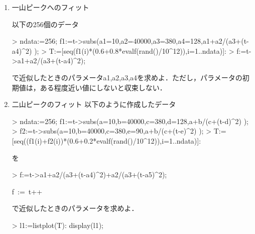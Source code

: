 \begin{enumerate}
\item 一山ピークへのフィット

以下の256個のデータ
\begin{MapleInput}
> ndata:=256; f1:=t->subs({a1=10,a2=40000,a3=380,a4=128},a1+a2/(a3+(t-a4)^2) );
> T:=[seq(f1(i)*(0.6+0.8*evalf(rand()/10^12)),i=1..ndata)]:
> f:=t->a1+a2/(a3+(t-a4)^2);
\end{MapleInput}
で近似したときのパラメータa1,a2,a3,a4を求めよ．ただし，パラメータの初期値は，ある程度近い値にしないと収束しない．
\item 二山ピークのフィット
以下のように作成したデータ
\begin{MapleInput}
> ndata:=256; f1:=t->subs({a=10,b=40000,c=380,d=128},a+b/(c+(t-d)^2) );
> f2:=t->subs({a=10,b=40000,c=380,e=90},a+b/(c+(t-e)^2) );
> T:=[seq((f1(i)+f2(i))*(0.6+0.2*evalf(rand()/10^12)),i=1..ndata)]:
\end{MapleInput}
を
\begin{MapleInput}
> f:=t->a1+a2/(a3+(t-a4)^2)+a2/(a3+(t-a5)^2);
\end{MapleInput}
\begin{MapleOutput}
f\, := \,t+{}+{}
\end{MapleOutput}
で近似したときのパラメータを求めよ．
\begin{MapleInput}
> l1:=listplot(T): display(l1);
\end{MapleInput}

\end{enumerate}
